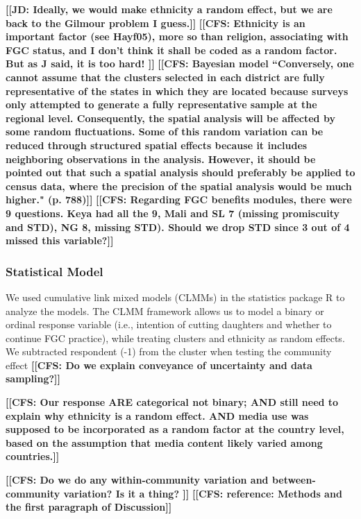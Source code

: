 \documentclass[12pt,]{article}
\newcommand{\comment}[1]{\textbf{[[#1]]}}
\newcommand{\cfcmt}[1]{\comment{CFS: #1}}
\newcommand{\jdcmt}[1]{\comment{JD: #1}}
\begin{document}
\jdcmt{Ideally, we would make ethnicity a random effect, but we are back to the Gilmour problem I guess.} \cfcmt{Ethnicity is an important factor (see Hayf05), more so than religion, associating with FGC status, and I don't think it shall be coded as a random factor.  But as J said, it is too hard! } %
\cfcmt{Bayesian model \cite{KandNwak09} ``Conversely, one cannot assume that the clusters selected in each district are fully representative of the states in which they are located because surveys only attempted to generate a fully representative sample at the regional level. Consequently, the spatial analysis will be affected by some random fluctuations.  Some of this random variation can be reduced through structured spatial effects because it includes neighboring observations in the analysis. However, it should be pointed out that such a spatial analysis should preferably be applied to census data, where the precision of the spatial analysis would be much higher." (p. 788)}
\cfcmt{Regarding FGC benefits modules, there were 9 questions.  Keya had all the 9, Mali and SL 7 (missing promiscuity and STD), NG 8, missing STD).  Should we drop STD since 3 out of 4 missed this variable?}

\subsubsection{Statistical Model}\label{statistical-model}

We used cumulative link mixed models (CLMMs) in the statistics package R \cite{Rstats,Rpackage_ordinal} to analyze the models.  The CLMM framework allows us to model a binary or ordinal response variable (i.e., intention of cutting daughters and whether to continue FGC practice), while treating clusters and ethnicity as random effects.  
We subtracted respondent (-1) from the cluster when testing the community effect 
\cfcmt{Do we explain conveyance of uncertainty and data sampling?}

\cfcmt{Our response ARE categorical not binary; AND still need to explain why ethnicity is a random effect. AND media use was supposed to be incorporated as a random factor at the country level, based on the assumption that media content likely varied among countries.}

\cfcmt{Do we do any within-community variation and between-community variation?  Is it a thing? }
\cfcmt{reference: Methods and the first paragraph of Discussion\cite{Chia14}}
\end{document}
